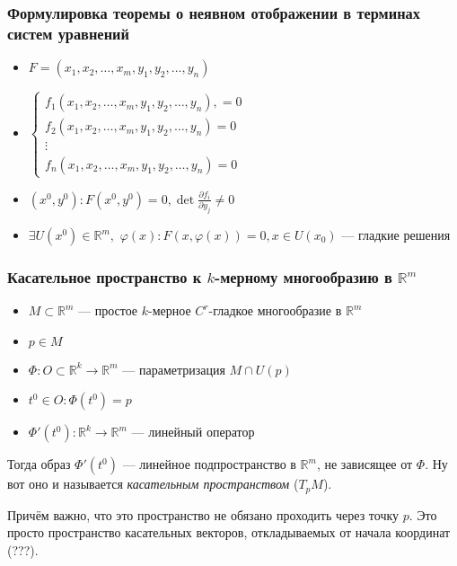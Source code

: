 \documentclass{article}
\def\dbl{\,\,}
\begin{document}
\subsubsection{Формулировка теоремы о неявном отображении в терминах систем уравнений}
\begin{itemize}
    \item $F = (x_1, x_2, \ldots, x_m, y_1, y_2, \ldots, y_n)$
    \item $\begin{cases}
        f_1(x_1, x_2, \ldots, x_m, y_1, y_2, \ldots, y_n) ,= 0\\
        f_2(x_1, x_2, \ldots, x_m, y_1, y_2, \ldots, y_n) = 0\\
        \vdots\\
        f_n(x_1, x_2, \ldots, x_m, y_1, y_2, \ldots, y_n) = 0
    \end{cases}$
    \item $(x^0, y^0): F(x^0, y^0) = 0, \det \frac{\partial f_i}{\partial y_j} \neq 0$
    \item $\exists U(x^0) \in \mathbb{R}^m, \dbl \varphi(x): F(x, \varphi(x)) = 0, x \in U(x_0)$ --- гладкие решения
\end{itemize}

\subsubsection{Касательное пространство к $k$-мерному многообразию в $\mathbb{R}^m$}

\begin{itemize}
    \item $M \subset \mathbb{R}^m$ --- простое $k$-мерное $C^r$-гладкое многообразие в $\mathbb{R}^m$
    \item $p \in M$
    \item $\Phi: O \subset \mathbb{R}^k \rightarrow \mathbb{R}^m$ --- параметризация $M \cap U(p)$
    \item $t^0 \in O: \Phi(t^0) = p$
    \item $\Phi'(t^0): \mathbb{R}^k \rightarrow \mathbb{R}^m$ --- линейный оператор
\end{itemize}

Тогда образ $\Phi'(t^0)$ --- линейное подпространство в $\mathbb{R}^m$, не зависящее от $\Phi$. Ну вот оно и называется \textit{касательным пространством} ($T_p M$).

Причём важно, что это пространство не обязано проходить через точку $p$. Это просто пространство касательных векторов, откладываемых от начала координат (???). 
\end{document}
